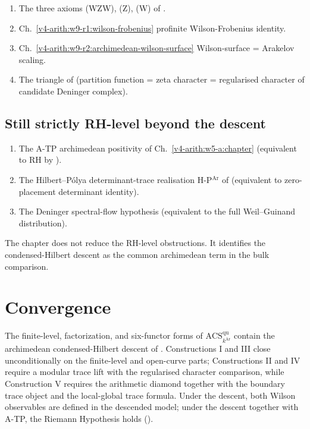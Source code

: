 \begin{enumerate}
\item The three axioms (WZW), (Z), (W) of
.
\item Ch.~\ref{v4-arith:w9-r1:wilson-frobenius} profinite
Wilson-Frobenius identity.
\item Ch.~\ref{v4-arith:w9-r2:archimedean-wilson-surface}
Wilson-surface = Arakelov scaling.
\item The triangle of  (partition
function = zeta character = regularised character of candidate
Deninger complex).
\end{enumerate}

\subsection*{Still strictly RH-level beyond the descent}

\begin{enumerate}
\item The A-TP archimedean positivity of
Ch.~\ref{v4-arith:w5-a:chapter} (equivalent to RH by
).
\item The Hilbert--P\'olya determinant-trace realisation H-P\(^{\mathrm{Ar}}\)
of  (equivalent to zero-placement
determinant identity).
\item The Deninger spectral-flow hypothesis
 (equivalent to the full
Weil--Guinand distribution).
\end{enumerate}

The chapter does not reduce the RH-level obstructions. It identifies
the condensed-Hilbert descent as the common archimedean term in the
bulk comparison.

\section{Convergence}
\label{v4-arith:w10-a:summary}

The finite-level, factorization, and six-functor forms of
\(\mathrm{ACS}^{\mathrm{qu}}_{k^{\mathrm{Ar}}}\) contain the
archimedean condensed-Hilbert descent of
. Constructions I and III close
unconditionally on the finite-level and open-curve parts; Constructions
II and IV require a modular trace lift with the regularised character
comparison, while Construction V requires the arithmetic diamond
together with the boundary trace object and the local-global trace
formula.
Under the descent, both Wilson observables are defined in the
descended model; under the descent together with A-TP, the Riemann
Hypothesis holds
().

